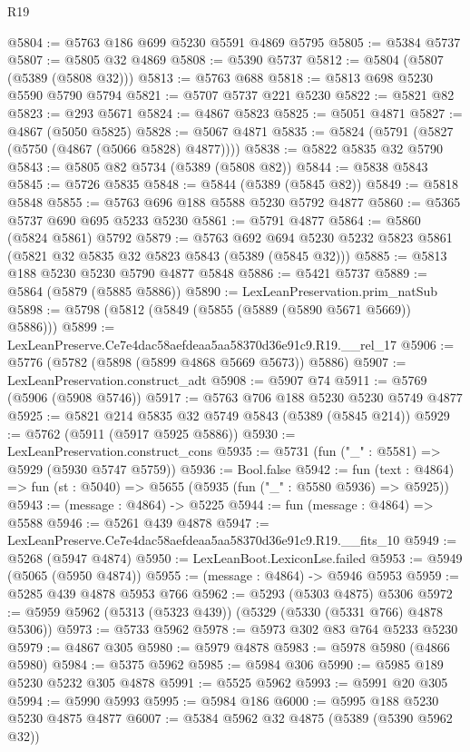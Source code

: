 \begin{lexlean}{R19}
\begin{coremodule}
@5804 := @5763 @186 @699 @5230 @5591 @4869 @5795
@5805 := @5384 @5737
@5807 := @5805 @32 @4869
@5808 := @5390 @5737
@5812 := @5804 (@5807 (@5389 (@5808 @32)))
@5813 := @5763 @688
@5818 := @5813 @698 @5230 @5590 @5790 @5794
@5821 := @5707 @5737 @221 @5230
@5822 := @5821 @82
@5823 := @293 @5671
@5824 := @4867 @5823
@5825 := @5051 @4871
@5827 := @4867 (@5050 @5825)
@5828 := @5067 @4871
@5835 := @5824 (@5791 (@5827 (@5750 (@4867 (@5066 @5828) @4877))))
@5838 := @5822 @5835 @32 @5790
@5843 := @5805 @82 @5734 (@5389 (@5808 @82))
@5844 := @5838 @5843
@5845 := @5726 @5835
@5848 := @5844 (@5389 (@5845 @82))
@5849 := @5818 @5848
@5855 := @5763 @696 @188 @5588 @5230 @5792 @4877
@5860 := @5365 @5737 @690 @695 @5233 @5230
@5861 := @5791 @4877
@5864 := @5860 (@5824 @5861) @5792
@5879 := @5763
    @692
    @694
    @5230
    @5232
    @5823
    @5861
    (@5821 @32 @5835 @32 @5823 @5843 (@5389 (@5845 @32)))
@5885 := @5813 @188 @5230 @5230 @5790 @4877 @5848
@5886 := @5421 @5737
@5889 := @5864 (@5879 (@5885 @5886))
@5890 := LexLeanPreservation.prim_natSub
@5898 := @5798 (@5812 (@5849 (@5855 (@5889 (@5890 @5671 @5669)) @5886)))
@5899 := LexLeanPreserve.Ce7e4dac58aefdeaa5aa58370d36e91c9.R19.__rel_17
@5906 := @5776 (@5782 (@5898 (@5899 @4868 @5669 @5673)) @5886)
@5907 := LexLeanPreservation.construct_adt
@5908 := @5907 @74
@5911 := @5769 (@5906 (@5908 @5746))
@5917 := @5763 @706 @188 @5230 @5230 @5749 @4877
@5925 := @5821 @214 @5835 @32 @5749 @5843 (@5389 (@5845 @214))
@5929 := @5762 (@5911 (@5917 @5925 @5886))
@5930 := LexLeanPreservation.construct_cons
@5935 := @5731 (fun ("_" : @5581) => @5929 (@5930 @5747 @5759))
@5936 := Bool.false
@5942 := fun (text : @4864) => fun (st : @5040) => @5655 (@5935 (fun ("_" : @5580 @5936) => @5925))
@5943 := (message : @4864) -> @5225
@5944 := fun (message : @4864) => @5588
@5946 := @5261 @439 @4878
@5947 := LexLeanPreserve.Ce7e4dac58aefdeaa5aa58370d36e91c9.R19.__fits_10
@5949 := @5268 (@5947 @4874)
@5950 := LexLeanBoot.LexiconLse.failed
@5953 := @5949 (@5065 (@5950 @4874))
@5955 := (message : @4864) -> @5946 @5953
@5959 := @5285 @439 @4878 @5953 @766
@5962 := @5293 (@5303 @4875) @5306
@5972 := @5959 @5962 (@5313 (@5323 @439)) (@5329 (@5330 (@5331 @766) @4878 @5306))
@5973 := @5733 @5962
@5978 := @5973 @302 @83 @764 @5233 @5230
@5979 := @4867 @305
@5980 := @5979 @4878
@5983 := @5978 @5980 (@4866 @5980)
@5984 := @5375 @5962
@5985 := @5984 @306
@5990 := @5985 @189 @5230 @5232 @305 @4878
@5991 := @5525 @5962
@5993 := @5991 @20 @305
@5994 := @5990 @5993
@5995 := @5984 @186
@6000 := @5995 @188 @5230 @5230 @4875 @4877
@6007 := @5384 @5962 @32 @4875 (@5389 (@5390 @5962 @32))

\end{coremodule}
\end{lexlean}
